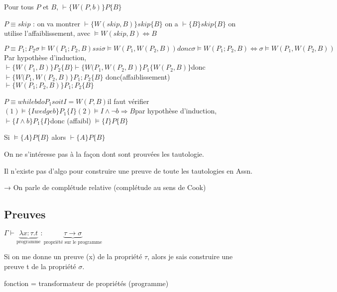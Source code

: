 \documentclass[10pt,a4paper]{article}
\newcommand{\semh}[3]{\{#1\}#2\{#3\}}
\begin{document}
\begin{lem}
 Pour tous $P$ et $B$, $\vdash \semh{W(P,b)}{P}{B}$
\end{lem}
\begin{dem}
$P \equiv skip$ : on va montrer $\vdash \semh{W(skip,B)}{skip}{B}$
	on a $\vdash \semh{B}{skip}{B}$
    on utilise l'affaiblissement, avec $\models W(skip,B) \Leftrightarrow B$

$P \equiv P_1; P_2
	\sigma \models W(P_1;P_2,B) ssi \sigma \models W(P_1,W(P_2,B))
      donc \sigma \models W(P_1;P_2,B) \Leftrightarrow \sigma \models W(P_1,W(P_2,B))$
Par hypothèse d'induction, $\vdash \semh{W(P_1,B)}{P_2}{B}
			   \vdash \semh{W(P_1,W(P_2,B)}{P_1}{W(P_2,B)}
	  $donc $\vdash \semh{W(P_1,W(P_2,B)}{P_1;P_2}{B}
	 $ donc(affaiblissement) $\vdash \semh{W(P_1;P_2,B)}{P_1;P_2}{B}$


$P \equiv while b do P_1
      soit I = W(P,B)
       $il faut vérifier $(1) \models \semh{I wedge b}{P_1}{I}
			(2) \models I \wedge \lnot b \Rightarrow B
	$par hypothèse d'induction, $\vdash \semh{I \wedge b}{P_1}{I}
		      $donc (affaibl) $\models \semh{I}{P}{B}
$

\end{dem}
\begin{thm}[de complétude]
 Si $\models \semh{A}{P}{B}$ alors $\vdash \semh{A}{P}{B}$
\end{thm}
\begin{rem}
 On ne s'intéresse pas à la façon dont sont prouvées les tautologie.
\end{rem}
\begin{thm}
 Il n'existe pas d'algo pour construire une preuve de toute les tautologies en Assn.
\end{thm}

→ On parle de complétude relative (complétude au sens de Cook)



\subsection{Preuves}
$
\Gamma \vdash \underbrace{\lambda x : \tau . t}_{\text{programme}} : \underbrace{\tau → \sigma}_{\text{propriété sur le programme}}$

Si on me donne un preuve (x) de la propriété $\tau$, alors je sais construire une preuve t de la propriété $\sigma$.

fonction = transformateur de propriétés (programme)
\end{document}
